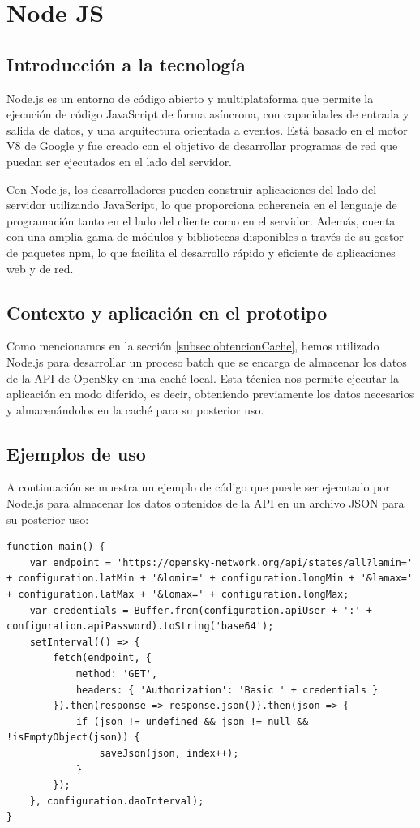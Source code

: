 \documentclass[a4paper, 11pt]{book}
\begin{document}
\section{Node JS}
\subsection{Introducción a la tecnología}
Node.js es un entorno de código abierto y multiplataforma que permite la ejecución de código JavaScript de forma asíncrona, con capacidades de entrada y salida de datos, y una arquitectura orientada a eventos. Está basado en el motor V8 de Google y fue creado con el objetivo de desarrollar programas de red que puedan ser ejecutados en el lado del servidor.

Con Node.js, los desarrolladores pueden construir aplicaciones del lado del servidor utilizando JavaScript, lo que proporciona coherencia en el lenguaje de programación tanto en el lado del cliente como en el servidor. Además, cuenta con una amplia gama de módulos y bibliotecas disponibles a través de su gestor de paquetes npm, lo que facilita el desarrollo rápido y eficiente de aplicaciones web y de red.
\subsection{Contexto y aplicación en el prototipo}
Como mencionamos en la sección \ref{subsec:obtencionCache}, hemos utilizado Node.js para desarrollar un proceso batch que se encarga de almacenar los datos de la API de \hyperref[sec:opensky]{OpenSky} en una caché local. Esta técnica nos permite ejecutar la aplicación en modo diferido, es decir, obteniendo previamente los datos necesarios y almacenándolos en la caché para su posterior uso.
\subsection{Ejemplos de uso}
A continuación se muestra un ejemplo de código que puede ser ejecutado por Node.js para almacenar los datos obtenidos de la API en un archivo JSON para su posterior uso:
\begin{verbatim}
function main() {
    var endpoint = 'https://opensky-network.org/api/states/all?lamin=' + configuration.latMin + '&lomin=' + configuration.longMin + '&lamax=' + configuration.latMax + '&lomax=' + configuration.longMax;
    var credentials = Buffer.from(configuration.apiUser + ':' + configuration.apiPassword).toString('base64');
    setInterval(() => {
        fetch(endpoint, {
            method: 'GET',
            headers: { 'Authorization': 'Basic ' + credentials }
        }).then(response => response.json()).then(json => {
            if (json != undefined && json != null && !isEmptyObject(json)) {
                saveJson(json, index++);
            }
        });
    }, configuration.daoInterval);
}
\end{verbatim}
\label{sec:nodejs}
\end{document}
